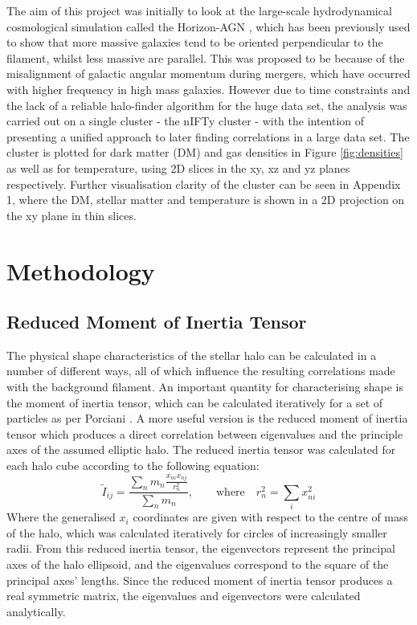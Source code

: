 \documentclass[journal]{IEEEtran}
\begin{document}
The aim of this project was initially to look at the large-scale hydrodynamical cosmological simulation called the Horizon-AGN \cite{dubois14}, which has been previously used to show that more massive galaxies tend to be oriented perpendicular to the filament, whilst less massive are parallel. This was proposed to be because of the misalignment of galactic angular momentum during mergers, which have occurred with higher frequency in high mass galaxies. However due to time constraints and the lack of a reliable halo-finder algorithm for the huge data set, the analysis was carried out on a single cluster - the nIFTy cluster \cite{nifty}- with the intention of presenting a unified approach to later finding correlations in a large data set. The cluster is plotted for dark matter (DM) and gas densities in Figure \ref{fig:densities} as well as for temperature, using 2D slices in the xy, xz and yz planes respectively. Further visualisation clarity of the cluster can be seen in Appendix 1, where the DM, stellar matter and temperature is shown in a 2D projection on the xy plane in thin slices. 

\section{Methodology}
\subsection{Reduced Moment of Inertia Tensor}
The physical shape characteristics of the stellar halo can be calculated in a number of different ways, all of which influence the resulting correlations made with the background filament. An important quantity for characterising shape is the moment of inertia tensor, which can be calculated iteratively for a set of particles as per Porciani \cite{porciani02a}. A more useful version is the reduced moment of inertia tensor \cite{tenneti15} which produces a direct correlation between eigenvalues and the principle axes of the assumed elliptic halo. The reduced inertia tensor was calculated for each halo cube according to the following equation:
\begin{equation}
	\tilde{I}_{ij}=\frac{\sum_n m_n \frac{x_{ni}x_{nj}}{r^2_n}}{\sum_n m_n}, \quad \quad \text{where} \quad r^2_n=\sum_i x^2_{ni}
	\label{eq:moitensor}
\end{equation}
Where the generalised $x_i$ coordinates are given with respect to the centre of mass of the halo, which was calculated iteratively for circles of increasingly smaller radii. From this reduced inertia tensor, the eigenvectors represent the principal axes of the halo ellipsoid, and the eigenvalues correspond to the square of the principal axes' lengths.
Since the reduced moment of inertia tensor produces a real symmetric matrix, the eigenvalues and eigenvectors were calculated analytically. 
\end{document}
